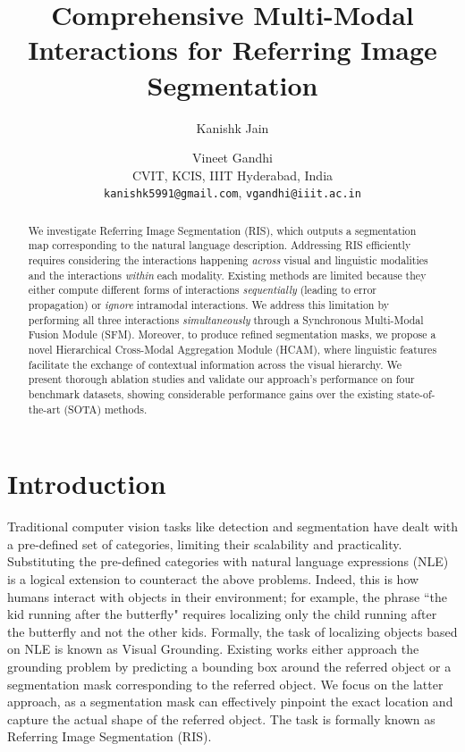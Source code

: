 \documentclass[11pt]{article}
\title{Comprehensive Multi-Modal Interactions for Referring Image Segmentation}
\author{Kanishk Jain \and Vineet Gandhi \\ CVIT, KCIS, IIIT Hyderabad, India \\ \texttt{kanishk5991@gmail.com},   \texttt{vgandhi@iiit.ac.in}}
\begin{document}
\maketitle
\begin{abstract}
We investigate Referring Image Segmentation (RIS), which outputs a segmentation map corresponding to the natural language description. Addressing RIS efficiently requires considering the interactions happening \emph{across} visual and linguistic modalities and the interactions \emph{within} each modality. Existing methods are limited because they either compute different forms of interactions \emph{sequentially} (leading to error propagation) or \emph{ignore} intramodal interactions. We address this limitation by performing all three interactions \emph{simultaneously} through a Synchronous Multi-Modal Fusion Module (SFM). Moreover, to produce refined segmentation masks, we propose a novel Hierarchical Cross-Modal Aggregation Module (HCAM), where linguistic features facilitate the exchange of contextual information across the visual hierarchy. We present thorough ablation studies and validate our approach's performance on four benchmark datasets, showing considerable performance gains over the existing state-of-the-art (SOTA) methods.
\end{abstract}

\section{Introduction}









Traditional computer vision tasks like detection and segmentation have dealt with a pre-defined set of categories, limiting their scalability and practicality. Substituting the pre-defined categories with natural language expressions (NLE) is a logical extension to counteract the above problems. Indeed, this is how humans interact with objects in their environment; for example, the phrase ``the kid running after the butterfly" requires localizing only the child running after the butterfly and not the other kids. Formally, the task of localizing objects based on NLE is known as Visual Grounding. Existing works either approach the grounding problem by predicting a bounding box around the referred object or a segmentation mask corresponding to the referred object. We focus on the latter approach, as a segmentation mask can effectively pinpoint the exact location and capture the actual shape of the referred object. The task is formally known as Referring Image Segmentation (RIS).
\end{document}
